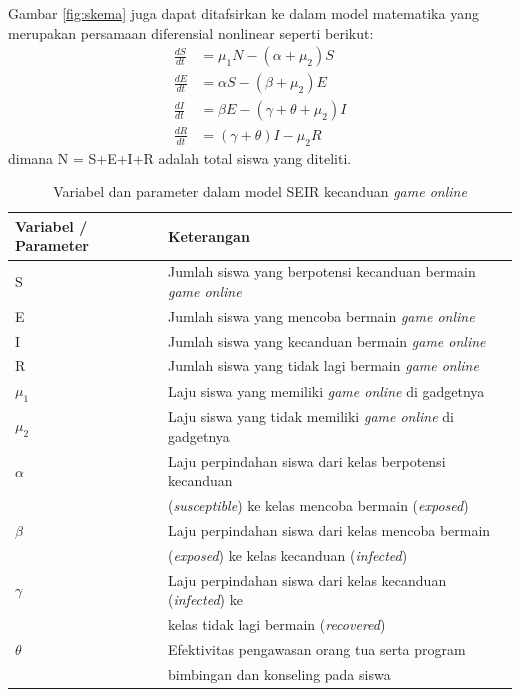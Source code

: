 \documentclass[a4paper, 12pt]{article}
\begin{document}
Gambar \ref{fig:skema} juga dapat ditafsirkan ke dalam model matematika yang merupakan persamaan diferensial nonlinear seperti berikut:
\begin{subequations} \label{eq:seir_model}
\begin{align}
    \frac{dS}{dt} &= \mu_1 N - (\alpha + \mu_2)S \\
    \frac{dE}{dt} &= \alpha S - (\beta + \mu_2)E \\
    \frac{dI}{dt} &= \beta E - (\gamma + \theta + \mu_2)I \\
    \frac{dR}{dt} &= (\gamma + \theta)I - \mu_2 R
\end{align}
\end{subequations}
dimana N = S+E+I+R adalah total siswa yang diteliti.

\begin{table}[h!]
    \centering
    \caption{Variabel dan parameter dalam model SEIR kecanduan \textit{game online}}
    \label{tab:variabel_parameter}
    \begin{tabular}{@{}ll@{}}
        \toprule
        Variabel / Parameter & Keterangan \\
        \midrule
        S & Jumlah siswa yang berpotensi kecanduan bermain \textit{game online} \\
        E & Jumlah siswa yang mencoba bermain \textit{game online} \\
        I & Jumlah siswa yang kecanduan bermain \textit{game online} \\
        R & Jumlah siswa yang tidak lagi bermain \textit{game online} \\
        $\mu_1$ & Laju siswa yang memiliki \textit{game online} di gadgetnya \\
        $\mu_2$ & Laju siswa yang tidak memiliki \textit{game online} di gadgetnya \\
        $\alpha$ & Laju perpindahan siswa dari kelas berpotensi kecanduan \\
                 & (\textit{susceptible}) ke kelas mencoba bermain (\textit{exposed}) \\
        $\beta$ & Laju perpindahan siswa dari kelas mencoba bermain \\
                & (\textit{exposed}) ke kelas kecanduan (\textit{infected}) \\
        $\gamma$ & Laju perpindahan siswa dari kelas kecanduan (\textit{infected}) ke \\
                 & kelas tidak lagi bermain (\textit{recovered}) \\
        $\theta$ & Efektivitas pengawasan orang tua serta program \\
                 & bimbingan dan konseling pada siswa \\
        \bottomrule
    \end{tabular}
\end{table}
\end{document}
